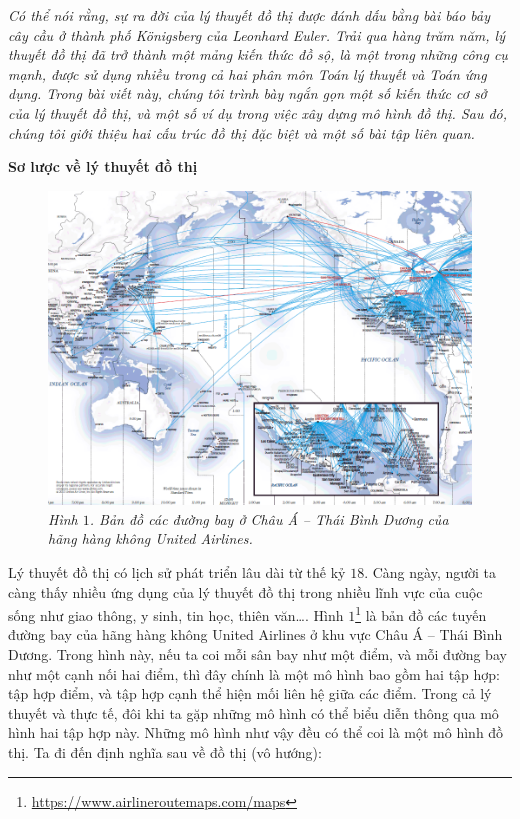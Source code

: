 \textit{Có thể nói rằng, sự ra đời của lý thuyết đồ thị được đánh dấu bằng bài báo \textit{bảy cây cầu ở thành phố Königsberg} của Leonhard Euler. Trải qua hàng trăm năm, lý thuyết đồ thị đã trở thành một mảng kiến thức đồ sộ, là một trong những công cụ mạnh, được sử dụng nhiều trong cả hai phân môn Toán lý thuyết và Toán ứng dụng. Trong bài viết này, chúng tôi trình bày ngắn gọn một số kiến thức cơ sở của lý thuyết đồ thị, và một số ví dụ trong việc xây dựng mô hình đồ thị. Sau đó, chúng tôi giới thiệu hai cấu trúc đồ thị đặc biệt và một số bài tập liên quan.}
\begin{multicols}{2}
	\textbf{\color{hoccungpi}Sơ lược về lý thuyết đồ thị}
	\begin{figure}[H]
		\vspace*{-5pt}
		\centering
		\captionsetup{labelformat= empty, justification=centering}
		\includegraphics[width= 1\linewidth]{United_Airlines_asia_pacific}
		\caption{\small\textit{\color{hoccungpi}Hình $1$. Bản đồ các đường bay ở Châu Á -- Thái Bình Dương của hãng hàng không United Airlines.}}
		\vspace*{-10pt}
	\end{figure}
	Lý thuyết đồ thị có lịch sử phát triển lâu dài từ thế kỷ $18$. Càng ngày, người ta càng thấy nhiều ứng dụng của lý thuyết đồ thị trong nhiều lĩnh vực của cuộc sống như giao thông, y sinh, tin học, thiên văn\dots. Hình $1$\footnote[2]{\url{https://www.airlineroutemaps.com/maps}} là bản đồ các tuyến đường bay của hãng hàng không United Airlines ở khu vực Châu Á -- Thái Bình Dương.
	\vskip 0.1cm
	Trong hình này, nếu ta coi mỗi sân bay như một điểm, và mỗi đường bay như một cạnh nối hai điểm, thì đây chính là một mô hình bao gồm hai tập hợp: tập hợp điểm, và tập hợp cạnh thể hiện mối liên hệ giữa các điểm. Trong cả lý thuyết và thực tế, đôi khi ta gặp những mô hình có thể biểu diễn thông qua mô hình hai tập hợp này. Những mô hình như vậy đều có thể coi là một mô hình đồ thị. Ta đi đến định nghĩa sau về đồ thị (vô hướng): 

\end{multicols}
